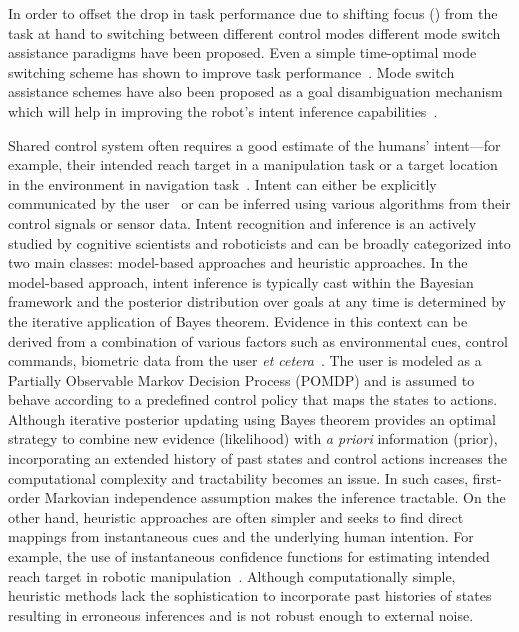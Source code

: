 In order to offset the drop in task performance due to shifting focus () from the task at hand to switching between different control modes different mode switch assistance paradigms have been proposed. Even a simple time-optimal mode switching scheme has shown to improve task performance~\cite{herlant2016assistive}. Mode switch assistance schemes have also been proposed as a goal disambiguation mechanism which will help in improving the robot's intent inference capabilities~\cite{gopinath2017mode}. 

Shared control system often requires a good estimate of the humans' intent---for example, their intended reach target in a manipulation task or a target location in the environment in navigation task~\cite{liu2016goal}. Intent can either be explicitly communicated by the user~\cite{choi2008laser} or can be inferred using various algorithms from their control signals or sensor data. Intent recognition and inference is an actively studied by cognitive scientists and roboticists and can be broadly categorized into two main classes: model-based approaches and heuristic approaches. In the model-based approach, intent inference is typically cast within the Bayesian framework and the posterior distribution over goals at any time is determined by the iterative application of Bayes theorem. Evidence in this context can be derived from a combination of various factors such as environmental cues, control commands, biometric data from the user \textit{et cetera}~\cite{baker2007goal, baker2009action}. The user is modeled as a Partially Observable Markov Decision Process (POMDP) and is assumed to behave according to a predefined control policy that maps the states to actions. Although iterative posterior updating using Bayes theorem provides an optimal strategy to combine new evidence (likelihood) with \textit{a priori} information (prior), incorporating an extended history of past states and control actions increases the computational complexity and tractability becomes an issue. In such cases,  first-order Markovian independence assumption makes the inference tractable. On the other hand, heuristic approaches are often simpler and seeks to find direct mappings from instantaneous cues and the underlying human intention. For example, the use of instantaneous confidence functions for estimating intended reach target in robotic manipulation~\cite{dragan2012assistive, gopinath2017human}. Although computationally simple, heuristic methods lack the sophistication to incorporate past histories of states resulting in erroneous inferences and is not robust enough to external noise. 

